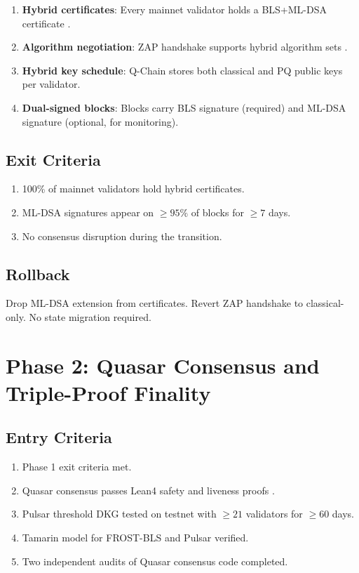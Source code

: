 \documentclass[11pt]{article}
\begin{document}
\begin{enumerate}
\item \textbf{Hybrid certificates}: Every mainnet validator holds a BLS+ML-DSA certificate \cite{hybrid-certs}.
\item \textbf{Algorithm negotiation}: ZAP handshake supports hybrid algorithm sets \cite{crypto-agility}.
\item \textbf{Hybrid key schedule}: Q-Chain stores both classical and PQ public keys per validator.
\item \textbf{Dual-signed blocks}: Blocks carry BLS signature (required) and ML-DSA signature (optional, for monitoring).
\end{enumerate}

\subsection{Exit Criteria}

\begin{enumerate}
\item 100\% of mainnet validators hold hybrid certificates.
\item ML-DSA signatures appear on $\geq 95\%$ of blocks for $\geq 7$ days.
\item No consensus disruption during the transition.
\end{enumerate}

\subsection{Rollback}

Drop ML-DSA extension from certificates. Revert ZAP handshake to classical-only. No state migration required.

\section{Phase 2: Quasar Consensus and Triple-Proof Finality}

\subsection{Entry Criteria}

\begin{enumerate}
\item Phase 1 exit criteria met.
\item Quasar consensus passes Lean4 safety and liveness proofs \cite{proof-methodology}.
\item Pulsar threshold DKG tested on testnet with $\geq 21$ validators for $\geq 60$ days.
\item Tamarin model for FROST-BLS and Pulsar verified.
\item Two independent audits of Quasar consensus code completed.
\end{enumerate}
\end{document}
